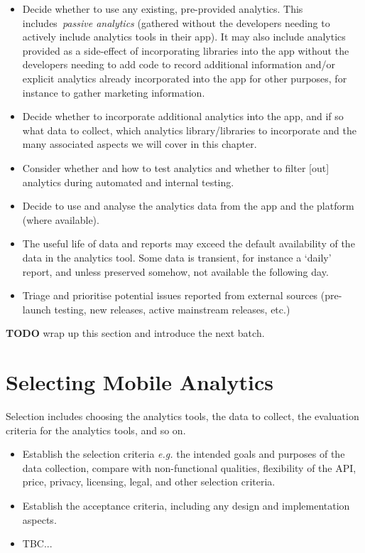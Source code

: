 \begin{itemize}
    \item Decide whether to use any existing, pre-provided analytics. This includes~\emph{passive analytics} (gathered without the developers needing to actively include analytics tools in their app). It may also include analytics provided as a side-effect of incorporating libraries into the app without the developers needing to add code to record additional information and/or explicit analytics already incorporated into the app for other purposes, for instance to gather marketing information. 
    \item Decide whether to incorporate additional analytics into the app, and if so what data to collect, which analytics library/libraries to incorporate and the many associated aspects we will cover in this chapter.
    \item Consider whether and how to test analytics and whether to filter [out] analytics during automated and internal testing.
    \item Decide to use and analyse the analytics data from the app and the platform (where available).
    \item The useful life of data and reports may exceed the default availability of the data in the analytics tool. Some data is transient, for instance a `daily' report, and unless preserved somehow, not available the following day.
    \item Triage and prioritise potential issues reported from external sources (pre-launch testing, new releases, active mainstream releases, etc.)
\end{itemize}


\textbf{TODO} wrap up this section and introduce the next batch.


\section{Selecting Mobile Analytics}
Selection includes choosing the analytics tools, the data to collect, the evaluation criteria for the analytics tools, and so on.
\begin{itemize}
    \item Establish the selection criteria \emph{e.g.} the intended goals and purposes of the data collection, compare with non-functional qualities, flexibility of the API, price, privacy, licensing, legal, and other selection criteria.
    \item Establish the acceptance criteria, including any design and implementation aspects.
    \item TBC...
\end{itemize}


